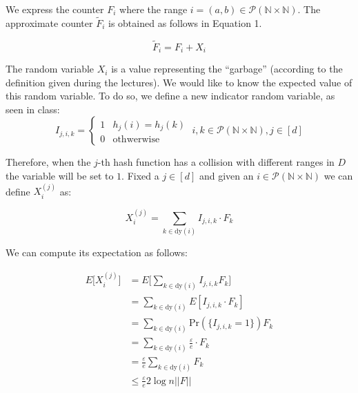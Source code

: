 \documentclass{article}
\begin{document}
\noindent We express the counter $F_{i}$ where the range $i = (a, b) \in \mathcal{P}(\mathbb{N} \times \mathbb{N})$. The approximate counter $\tilde{F}_{i}$ is obtained
as follows in Equation 1.

\begin{equation}
    \tilde{F}_{i} = F_{i} + X_i
\end{equation}

\noindent The random variable $X_{i}$ is a value representing the ``garbage'' (according to the definition given during the lectures). We would like to know the expected value of this random variable.
To do so, we define a new indicator random variable, as seen in class:
\begin{equation*}
    I_{j,i,k} = \begin{cases}
        1 & h_j(i) = h_j(k) \\
        0 & \textrm{othwerwise}
    \end{cases} \; i, k \in \mathcal{P}(\mathbb{N} \times \mathbb{N}), j \in [d]
\end{equation*}

\noindent Therefore, when the $j$-th hash function has a collision with different ranges in $D$ the variable will be set to $1$. 
Fixed a $j \in [d]$ and given an $i \in \mathcal{P}(\mathbb{N} \times \mathbb{N})$ we can define $X_{i}^{(j)}$ as: 

\begin{equation*}
    X_{i}^{(j)} = \sum_{k \in \textrm{dy}(i)}I_{j, i, k} \cdot  F_k
\end{equation*}

\noindent We can compute its expectation as follows:

\begin{equation*}
    \begin{split}
        E\bigg[X_{i}^{(j)}\bigg] & = E\bigg[\sum_{k \in \textrm{dy}(i)}I_{j, i, k} F_k\bigg] \\
        & = \sum_{k \in \textrm{dy}(i)} E[I_{j, i, k} \cdot F_k] \\
        & = \sum_{k \in \textrm{dy}(i)} \textrm{Pr}(\{I_{j, i, k} = 1\}) F_k \\
        & = \sum_{k \in \textrm{dy}(i)} \frac{\varepsilon}{e} \cdot  F_k \\ 
        & = \frac{\varepsilon}{e} \sum_{k \in \textrm{dy}(i)} F_k \\
        & \le \frac{\varepsilon}{e} 2 \log n ||F||
    \end{split}
\end{equation*}
\end{document}
